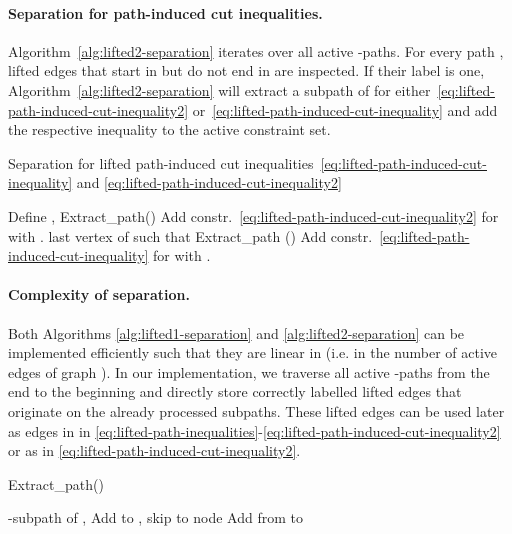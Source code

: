 \documentclass{article}
\begin{document}
\paragraph{Separation for path-induced cut inequalities.}
Algorithm~\ref{alg:lifted2-separation} iterates over all active -paths.
For every path , lifted edges that start in  but do not end in  are inspected.
If their label is one, Algorithm~\ref{alg:lifted2-separation} will extract a subpath of  for either~\eqref{eq:lifted-path-induced-cut-inequality2} or~\eqref{eq:lifted-path-induced-cut-inequality} and add the respective inequality to the active constraint set.
 \begin{algorithm}[!ht]
    \caption{Separation for lifted path-induced cut inequalities~\eqref{eq:lifted-path-induced-cut-inequality} and \eqref{eq:lifted-path-induced-cut-inequality2}}
    \label{alg:lifted2-separation}
    \begin{algorithmic}
       \STATE Define , 
          \FORALL{}
          \IF{}
          \STATE  \textrm{Extract\_path()}
          \STATE Add constr.~\eqref{eq:lifted-path-induced-cut-inequality2} for  with  .
         \ELSE
         \STATE  last vertex of  such that 
         \STATE  \textrm{Extract\_path ()}
          \STATE Add constr.~\eqref{eq:lifted-path-induced-cut-inequality} for  with  .
         \ENDIF      
         \ENDFOR
        \ENDFOR
    \end{algorithmic}
\end{algorithm}
\paragraph{Complexity of separation.}
Both Algorithms \ref{alg:lifted1-separation} and \ref{alg:lifted2-separation} can be implemented efficiently such that they are linear in  (i.e. in the number of active edges of graph ).
In our implementation, we traverse all active -paths from the end to the beginning and directly store correctly labelled lifted edges that originate on the already processed subpaths. These lifted edges can be used later as edges in  in \eqref{eq:lifted-path-inequalities}-\eqref{eq:lifted-path-induced-cut-inequality2} or as  in \eqref{eq:lifted-path-induced-cut-inequality2}. 
\begin{algorithm}[!ht]
    \caption{Extract\_path()}
    \label{alg:extract-path}
    \begin{algorithmic}
        \STATE  -subpath of , 
        \STATE Add  to , skip to node 
        \ELSE 
        \STATE Add  from  to 
        \ENDIF
        \ENDFOR
        \OUTPUT{}
    \end{algorithmic}
\end{algorithm}
\end{document}
